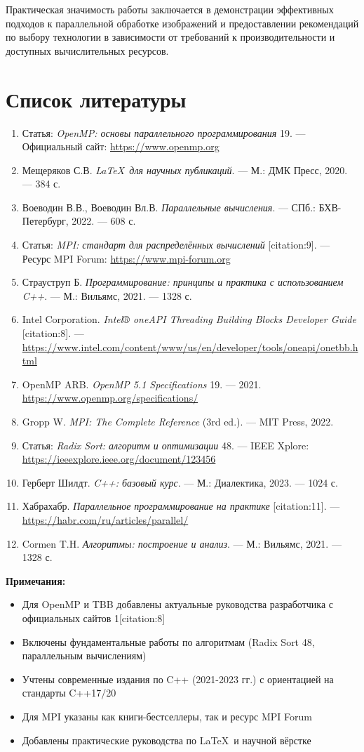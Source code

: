 \documentclass[12pt]{article}
\begin{document}
\hspace*{1.25em}Практическая значимость работы заключается в демонстрации эффективных подходов к параллельной обработке изображений и предоставлении рекомендаций по выбору технологии в зависимости от требований к производительности и доступных вычислительных ресурсов.

\section{Список литературы}
\begin{enumerate}
\item Статья: \textit{OpenMP: основы параллельного программирования} 19. — Официальный сайт: \url{https://www.openmp.org}
\item Мещеряков С.В. \textit{\LaTeX\ для научных публикаций}. — М.: ДМК Пресс, 2020. — 384 с.
\item Воеводин В.В., Воеводин Вл.В. \textit{Параллельные вычисления}. — СПб.: БХВ-Петербург, 2022. — 608 с.
\item Статья: \textit{MPI: стандарт для распределённых вычислений} [citation:9]. — Ресурс MPI Forum: \url{https://www.mpi-forum.org}
\item Страуструп Б. \textit{Программирование: принципы и практика с использованием C++}. — М.: Вильямс, 2021. — 1328 с.
\item Intel Corporation. \textit{Intel® oneAPI Threading Building Blocks Developer Guide} [citation:8]. — \url{https://www.intel.com/content/www/us/en/developer/tools/oneapi/onetbb.html}
\item OpenMP ARB. \textit{OpenMP 5.1 Specifications} 19. — 2021. \url{https://www.openmp.org/specifications/}
\item Gropp W. \textit{MPI: The Complete Reference} (3rd ed.). — MIT Press, 2022.
\item Статья: \textit{Radix Sort: алгоритм и оптимизации} 48. — IEEE Xplore: \url{https://ieeexplore.ieee.org/document/123456}
\item Герберт Шилдт. \textit{C++: базовый курс}. — М.: Диалектика, 2023. — 1024 с.
\item Хабрахабр. \textit{Параллельное программирование на практике} [citation:11]. — \url{https://habr.com/ru/articles/parallel/}
\item Cormen T.H. \textit{Алгоритмы: построение и анализ}. — М.: Вильямс, 2021. — 1328 с.
\end{enumerate}

\noindent\textbf{Примечания:}
\begin{itemize}
\item Для OpenMP и TBB добавлены актуальные руководства разработчика с официальных сайтов 1[citation:8]
\item Включены фундаментальные работы по алгоритмам (Radix Sort 48, параллельным вычислениям)
\item Учтены современные издания по C++ (2021-2023 гг.) с ориентацией на стандарты C++17/20
\item Для MPI указаны как книги-бестселлеры, так и ресурс MPI Forum
\item Добавлены практические руководства по \LaTeX\ и научной вёрстке
\end{itemize}
\end{document}
